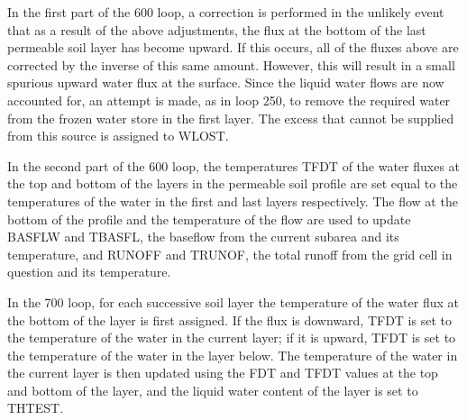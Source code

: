 In the first part of the 600 loop, a correction is performed in the unlikely event that as a result of the above adjustments, the flux at the bottom of the last permeable soil layer has become upward. If this occurs, all of the fluxes above are corrected by the inverse of this same amount. However, this will result in a small spurious upward water flux at the surface. Since the liquid water flows are now accounted for, an attempt is made, as in loop 250, to remove the required water from the frozen water store in the first layer. The excess that cannot be supplied from this source is assigned to W\+L\+O\+S\+T.

In the second part of the 600 loop, the temperatures T\+F\+D\+T of the water fluxes at the top and bottom of the layers in the permeable soil profile are set equal to the temperatures of the water in the first and last layers respectively. The flow at the bottom of the profile and the temperature of the flow are used to update B\+A\+S\+F\+L\+W and T\+B\+A\+S\+F\+L, the baseflow from the current subarea and its temperature, and R\+U\+N\+O\+F\+F and T\+R\+U\+N\+O\+F, the total runoff from the grid cell in question and its temperature.

In the 700 loop, for each successive soil layer the temperature of the water flux at the bottom of the layer is first assigned. If the flux is downward, T\+F\+D\+T is set to the temperature of the water in the current layer; if it is upward, T\+F\+D\+T is set to the temperature of the water in the layer below. The temperature of the water in the current layer is then updated using the F\+D\+T and T\+F\+D\+T values at the top and bottom of the layer, and the liquid water content of the layer is set to T\+H\+T\+E\+S\+T.